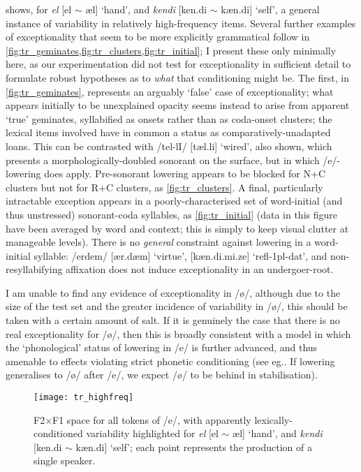  shows, for \emph{el} [el $\sim$ \ae l] `hand', and \emph{kendi} [ken.di $\sim$ k\ae n.di] `self', a general instance of variability in relatively high-frequency items. Several further examples of exceptionality that seem to be more explicitly grammatical follow in \cref{fig:tr_geminates,fig:tr_clusters,fig:tr_initial}; I present these only minimally here, as our experimentation did not test for exceptionality in sufficient detail to formulate robust hypotheses as to \emph{what} that conditioning might be. The first, in \cref{fig:tr_geminates}, represents an arguably `false' case of exceptionality; what appears initially to be unexplained opacity seems instead to arise from apparent `true' geminates, syllabified as onsets rather than as coda-onset clusters; the lexical items involved have in common a status as comparatively-unadapted loans. This can be contrasted with /tel-lI/ [t\ae l.li] `wired', also shown, which presents a morphologically-doubled sonorant on the surface, but in which /e/-lowering does apply. Pre-sonorant lowering appears to be blocked for N+C clusters but not for R+C clusters, as \cref{fig:tr_clusters}. A final, particularly intractable exception appears in a poorly-characterised set of word-initial (and thus unstressed) sonorant-coda syllables, as \cref{fig:tr_initial} (data in this figure have been averaged by word and context; this is simply to keep visual clutter at manageable levels). There is no \emph{general} constraint against lowering in a word-initial syllable: /erdem/ [\ae r.d\ae m] `virtue', [kæn.di.mi.ze] `{\sc refl-1pl-dat}', and non-resyllabifying affixation does not induce exceptionality in an undergoer-root.

I am unable to find any evidence of exceptionality in /ø/, although due to the size of the test set and the greater incidence of variability in /ø/, this should be taken with a certain amount of salt. If it is genuinely the case that there is no real exceptionality for /ø/, then this is broadly consistent with a model in which the `phonological' status of lowering in /e/ is further advanced, and thus amenable to effects violating strict phonetic conditioning (see eg.\citealt{BermudezOtero2015}. If lowering generalises to /\o/ after /e/, we expect /\o/ to be behind in stabilisation).

\begin{figure}[H]
  \centering
  \texttt{[image: tr\_highfreq]}
  \caption[F2$\times$F1 space for all tokens of /e/; sporadic, lexical variability.]{F2$\times$F1 space for all tokens of /e/, with apparently lexically-conditioned variability highlighted for \emph{el} [el $\sim$ \ae l] `hand', and \emph{kendi} [ken.di $\sim$ k\ae n.di] `self'; each point represents the production of a single speaker.}
  \label{fig:highfreq}
\end{figure}


